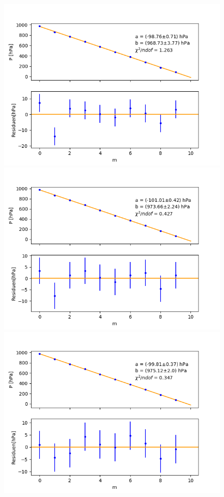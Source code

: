 \documentclass[12pt,a4paper]{article}
\begin{document}
\begin{figure}
\centering
\includegraphics[scale=0.5]{Bilder/Druck_A_Var2_2.png}
\includegraphics[scale=0.5]{Bilder/Druck_A_Var2_3.png}
\includegraphics[scale=0.5]{Bilder/Druck_A_Var2_4.png}

\end{figure}
\end{document}
